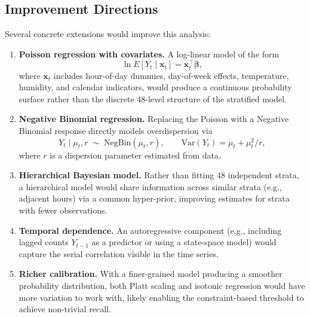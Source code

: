 \documentclass[12pt]{article}
\begin{document}
\subsection{Improvement Directions}

Several concrete extensions would improve this analysis:

\begin{enumerate}
\item \textbf{Poisson regression with covariates.}  A log-linear
  model of the form
  \begin{equation}
  \ln E[Y_t \mid \mathbf{x}_t] = \mathbf{x}_t^\top \boldsymbol{\beta},
  \end{equation}
  where $\mathbf{x}_t$ includes hour-of-day dummies, day-of-week
  effects, temperature, humidity, and calendar indicators, would
  produce a continuous probability surface rather than the discrete
  48-level structure of the stratified model.

\item \textbf{Negative Binomial regression.}  Replacing the Poisson
  with a Negative Binomial response directly models overdispersion
  via
  \begin{equation}
  Y_t \mid \mu_t, r \;\sim\; \text{NegBin}(\mu_t, r),
  \qquad \text{Var}(Y_t) = \mu_t + \mu_t^2/r,
  \end{equation}
  where $r$ is a dispersion parameter estimated from data.

\item \textbf{Hierarchical Bayesian model.}  Rather than fitting 48
  independent strata, a hierarchical model would share information
  across similar strata (e.g., adjacent hours) via a common
  hyper-prior, improving estimates for strata with fewer observations.

\item \textbf{Temporal dependence.}  An autoregressive component
  (e.g., including lagged counts $Y_{t-1}$ as a predictor or using a
  state-space model) would capture the serial correlation visible in
  the time series.

\item \textbf{Richer calibration.}  With a finer-grained model
  producing a smoother probability distribution, both Platt scaling
  and isotonic regression would have more variation to work with,
  likely enabling the constraint-based threshold to achieve non-trivial
  recall.
\end{enumerate}

\end{document}
